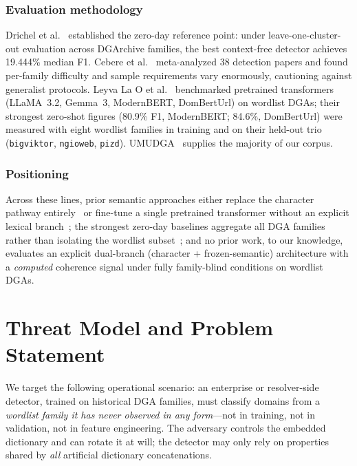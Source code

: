 \documentclass[conference]{IEEEtran}
\begin{document}
\subsubsection*{Evaluation methodology}
Drichel et al.~\cite{drichel2022} established the zero-day reference point: under leave-one-cluster-out evaluation across DGArchive families, the best context-free detector achieves 19.444\% median F1. Cebere et al.~\cite{cebere2024} meta-analyzed 38 detection papers and found per-family difficulty and sample requirements vary enormously, cautioning against generalist protocols. Leyva La O et al.~\cite{leyva2026} benchmarked pretrained transformers (LLaMA~3.2, Gemma~3, ModernBERT, DomBertUrl) on wordlist DGAs; their strongest zero-shot figures (80.9\% F1, ModernBERT; 84.6\%, DomBertUrl) were measured with eight wordlist families in training and on their held-out trio (\texttt{bigviktor}, \texttt{ngioweb}, \texttt{pizd}). UMUDGA~\cite{zago2020dib,zago2020cose} supplies the majority of our corpus.

\subsubsection*{Positioning}
Across these lines, prior semantic approaches either replace the character pathway entirely~\cite{koh2018} or fine-tune a single pretrained transformer without an explicit lexical branch~\cite{leyva2026}; the strongest zero-day baselines aggregate all DGA families rather than isolating the wordlist subset~\cite{drichel2022}; and no prior work, to our knowledge, evaluates an explicit dual-branch (character + frozen-semantic) architecture with a \emph{computed} coherence signal under fully family-blind conditions on wordlist DGAs.

\section{Threat Model and Problem Statement}
We target the following operational scenario: an enterprise or resolver-side detector, trained on historical DGA families, must classify domains from a \emph{wordlist family it has never observed in any form}---not in training, not in validation, not in feature engineering. The adversary controls the embedded dictionary and can rotate it at will; the detector may only rely on properties shared by \emph{all} artificial dictionary concatenations.
\end{document}
